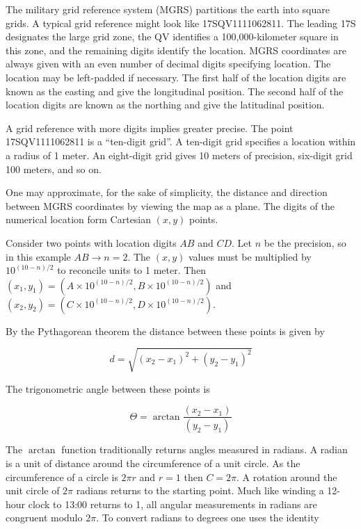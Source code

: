 \documentclass{book}
\begin{document}
The military grid reference system (MGRS) partitions the earth into square grids. A typical grid reference might look like 17SQV1111062811. The leading 17S designates the large grid zone, the QV identifies a 100,000-kilometer square in this zone, and the remaining digits identify the location. MGRS coordinates are always given with an even number of decimal digits specifying location. The location may be left-padded if necessary. The first half of the location digits are known as the easting and give the longitudinal position. The second half of the location digits are known as the northing and give the latitudinal position.

A grid reference with more digits implies greater precise. The point 17SQV1111062811 is a ``ten-digit grid''. A ten-digit grid specifies a location within a radius of 1 meter. An eight-digit grid gives 10 meters of precision, six-digit grid 100 meters, and so on.

One may approximate, for the sake of simplicity, the distance and direction between MGRS coordinates by viewing the map as a plane. The digits of the numerical location form Cartesian $(x,y)$ points.

Consider two points with location digits $AB$ and $CD$. Let $n$ be the precision, so in this example $AB \to n=2$. The $(x,y)$ values must be multiplied by $10^{{(10-n)}/2}$ to reconcile units to 1 meter. Then $(x_1,y_1) = (A \times 10^{{(10 - n)}/2}, B \times 10^{{(10 - n)}/2})$ and $(x_2,y_2) = (C \times 10^{{(10 - n)}/2}, D \times 10^{{(10 - n)}/2})$.

By the Pythagorean theorem the distance between these points is given by 

\begin{equation}
d = \sqrt{(x_2 - x_1)^2 + (y_2 - y_1)^2}
\end{equation}

The trigonometric angle between these points is

\begin{equation}
\Theta = \arctan{\frac{(x_2 - x_1)}{(y_2 - y_1)}}
\end{equation}

The $\arctan$ function traditionally returns angles measured in radians. A radian is a unit of distance around the circumference of a unit circle. As the circumference of a circle is $2 \pi r$ and $r=1$ then $C=2\pi$. A rotation around the unit circle of $2\pi$ radians returns to the starting point. Much like winding a 12-hour clock to 13:00 returns to 1, all angular measurements in radians are congruent modulo $2\pi$. To convert radians to degrees one uses the identity
\end{document}
